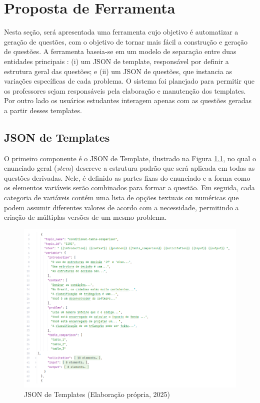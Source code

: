 \chapter{Proposta de Ferramenta}

Nesta seção, será apresentada uma ferramenta cujo objetivo é automatizar a geração de questões, com o objetivo de tornar mais fácil a construção e geração de questões. A ferramenta baseia-se em um modelo de separação entre duas entidades principais : (i) um JSON de template, responsável por definir a estrutura geral das questões; e (ii) um JSON de questões, que instancia as variações específicas de cada problema. O sistema foi planejado para permitir que os professores sejam responsáveis pela elaboração e manutenção dos templates. Por outro lado os usuários estudantes interagem apenas com as questões geradas a partir desses templates.

\section{JSON de Templates}

O primeiro componente é o JSON de Template, ilustrado na Figura \ref{fig:json-de-templates}, no qual o enunciado geral (\textit{stem}) descreve a estrutura padrão que será aplicada em todas as questões derivadas. Nele, é definido as partes fixas do enunciado e a forma como os elementos variáveis serão combinados para formar a questão. Em seguida, cada categoria de variáveis contém uma lista de opções textuais ou numéricas que podem assumir diferentes valores de acordo com a necessidade, permitindo a criação de múltiplas versões de um mesmo problema.


\begin{figure}[ht]
	\centering
	\includegraphics[width=16cm]{./imagens/capitulo7/json-de-template}
	\caption{JSON de Templates (Elaboração própria, 2025) }
	\label{fig:json-de-templates}
\end{figure}
